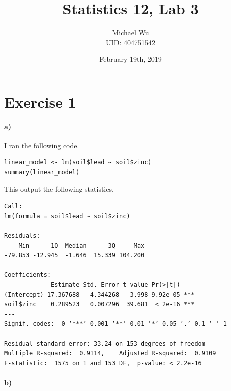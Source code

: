 \documentclass[12pt]{article}
\begin{document}
\title{Statistics 12, Lab 3}
\date{February 19th, 2019}
\author{Michael Wu\\UID: 404751542}
\maketitle

\section*{Exercise 1}

\paragraph{a)}

I ran the following code.
\begin{verbatim}
linear_model <- lm(soil$lead ~ soil$zinc)
summary(linear_model)
\end{verbatim}
This output the following statistics.
\begin{verbatim}
Call:
lm(formula = soil$lead ~ soil$zinc)

Residuals:
    Min      1Q  Median      3Q     Max
-79.853 -12.945  -1.646  15.339 104.200

Coefficients:
             Estimate Std. Error t value Pr(>|t|)
(Intercept) 17.367688   4.344268   3.998 9.92e-05 ***
soil$zinc    0.289523   0.007296  39.681  < 2e-16 ***
---
Signif. codes:  0 ‘***’ 0.001 ‘**’ 0.01 ‘*’ 0.05 ‘.’ 0.1 ‘ ’ 1

Residual standard error: 33.24 on 153 degrees of freedom
Multiple R-squared:  0.9114,	Adjusted R-squared:  0.9109
F-statistic:  1575 on 1 and 153 DF,  p-value: < 2.2e-16
\end{verbatim}

\paragraph{b)}
\end{document}

